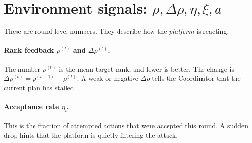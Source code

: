 \documentclass[11pt]{article}
\theoremstyle{definition}
\begin{document}
\section{Environment signals: \texorpdfstring{$\rho,\Delta\rho,\eta,\xi,a$}{rho, delta-rho, eta, xi, a}}

These are round-level numbers. They describe how the \emph{platform} is reacting.

\paragraph{Rank feedback $\rho^{(t)}$ and $\Delta\rho^{(t)}$.} The number
$\rho^{(t)}$ is the mean target rank, and lower is better. The change is
$\Delta\rho^{(t)}=\rho^{(t-1)}-\rho^{(t)}$. A weak or negative $\Delta\rho$ tells
the Coordinator that the current plan has stalled.

\paragraph{Acceptance rate $\eta_t$.} This is the fraction of attempted actions
that were accepted this round. A sudden drop hints that the platform is quietly
filtering the attack.
\end{document}
